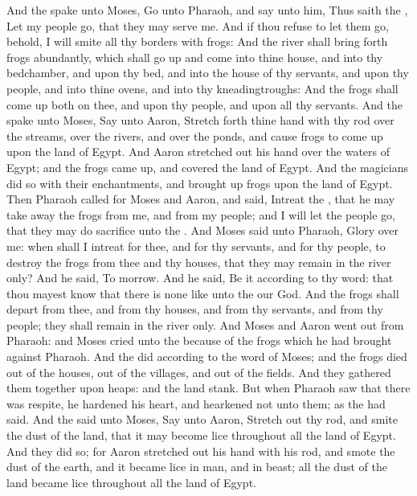 \begin{biblechapter} %
 And the \LORD spake unto Moses, Go unto Pharaoh, and say unto him, Thus saith the \LORD, Let my people go, that they may serve me.
\verse And if thou refuse to let them go, behold, I will smite all thy borders with frogs:
\verse And the river shall bring forth frogs abundantly, which shall go up and come into thine house, and into thy bedchamber, and upon thy bed, and into the house of thy servants, and upon thy people, and into thine ovens, and into thy kneadingtroughs:
\verse And the frogs shall come up both on thee, and upon thy people, and upon all thy servants.
\verse And the \LORD spake unto Moses, Say unto Aaron, Stretch forth thine hand with thy rod over the streams, over the rivers, and over the ponds, and cause frogs to come up upon the land of Egypt.
\verse And Aaron stretched out his hand over the waters of Egypt; and the frogs came up, and covered the land of Egypt.
\verse And the magicians did so with their enchantments, and brought up frogs upon the land of Egypt.
\verse Then Pharaoh called for Moses and Aaron, and said, Intreat the \LORD, that he may take away the frogs from me, and from my people; and I will let the people go, that they may do sacrifice unto the \LORD.
\verse And Moses said unto Pharaoh, Glory over me: when shall I intreat for thee, and for thy servants, and for thy people, to destroy the frogs from thee and thy houses, that they may remain in the river only?
\verse And he said, To morrow. And he said, Be it according to thy word: that thou mayest know that there is none like unto the \LORD our God.
\verse And the frogs shall depart from thee, and from thy houses, and from thy servants, and from thy people; they shall remain in the river only.
\verse And Moses and Aaron went out from Pharaoh: and Moses cried unto the \LORD because of the frogs which he had brought against Pharaoh.
\verse And the \LORD did according to the word of Moses; and the frogs died out of the houses, out of the villages, and out of the fields.
\verse And they gathered them together upon heaps: and the land stank.
\verse But when Pharaoh saw that there was respite, he hardened his heart, and hearkened not unto them; as the \LORD had said.
 And the \LORD said unto Moses, Say unto Aaron, Stretch out thy rod, and smite the dust of the land, that it may become lice throughout all the land of Egypt.
\verse And they did so; for Aaron stretched out his hand with his rod, and smote the dust of the earth, and it became lice in man, and in beast; all the dust of the land became lice throughout all the land of Egypt.

\end{biblechapter}
